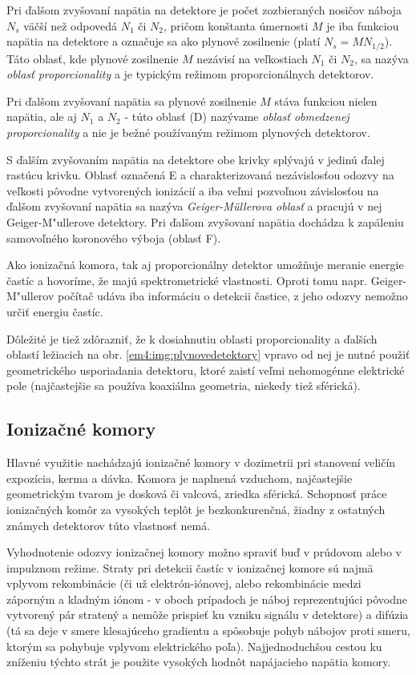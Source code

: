 \documentclass[../../main.tex]{subfiles}
\begin{document}
Pri ďalšom zvyšovaní napätia na detektore je počet zozbieraných nosičov náboja $N_s$ väčší než odpovedá $N_1$ či $N_2$, pričom konštanta úmernosti $M$ je iba funkciou napätia na detektore a označuje sa ako plynové zosilnenie (platí $N_s=MN_{1/2}$). Táto oblasť, kde plynové zosilnenie $M$ nezávisí na veľkostiach $N_1$ či $N_2$, sa nazýva \textit{oblasť proporcionality} a je typickým režimom proporcionálnych detektorov.

Pri ďalšom zvyšovaní napätia sa plynové zosilnenie $M$ stáva funkciou nielen napätia, ale aj $N_1$ a $N_2$ - túto oblasť (D) nazývame \textit{oblasť obmedzenej proporcionality} a nie je bežné používaným režimom plynových detektorov.

S ďalším zvyšovaním napätia na detektore obe krivky splývajú v jedinú ďalej rastúcu krivku. Oblasť označená E a charakterizovaná nezávislosťou odozvy na veľkosti pôvodne vytvorených ionizácií a iba veľmi pozvoľnou závislosťou na ďalšom zvyšovaní napätia sa nazýva \textit{Geiger-M\"{u}llerova oblasť} a pracujú v nej Geiger-M"ullerove detektory. Pri ďalšom zvyšovaní napätia dochádza k zapáleniu samovoľného koronového výboja (oblasť F).

Ako ionizačná komora, tak aj proporcionálny detektor umožňuje meranie energie častíc a hovoríme, že majú spektrometrické vlastnosti. Oproti tomu napr. Geiger-M"ullerov počítač udáva iba informáciu o detekcii častice, z jeho odozvy nemožno určiť energiu častíc.

Dôležité je tiež zdôrazniť, že k dosiahnutiu oblasti proporcionality a ďalších oblastí ležiacich na obr. \ref{em4:img:plynovedetektory} vpravo od nej je nutné použiť geometrického usporiadania detektoru, ktoré zaistí veľmi nehomogénne elektrické pole (najčastejšie sa používa koaxiálna geometria, niekedy tiež sférická).

\subsection{Ionizačné komory}

Hlavné využitie nachádzajú ionizačné komory v dozimetrii pri stanovení veličín expozícia, kerma a dávka. Komora je naplnená vzduchom, najčastejšie geometrickým tvarom je dosková či valcová, zriedka sférická. Schopnosť práce ionizačných komôr za vysokých teplôt je bezkonkurenčná, žiadny z ostatných známych detektorov túto vlastnosť nemá.

Vyhodnotenie odozvy ionizačnej komory možno spraviť buď v prúdovom alebo v impulznom režime. Straty pri detekcii častíc v ionizačnej komore sú najmä vplyvom rekombinácie (či už elektrón-iónovej, alebo rekombinácie medzi záporným a kladným iónom - v oboch prípadoch je náboj reprezentujúci pôvodne vytvorený pár stratený a nemôže prispieť ku vzniku signálu v detektore) a difúzia (tá sa deje v smere klesajúceho gradientu a spôsobuje pohyb nábojov proti smeru, ktorým sa pohybuje vplyvom elektrického poľa). Najjednoduchšou cestou ku zníženiu týchto strát je použite vysokých hodnôt napájacieho napätia komory.
\end{document}
